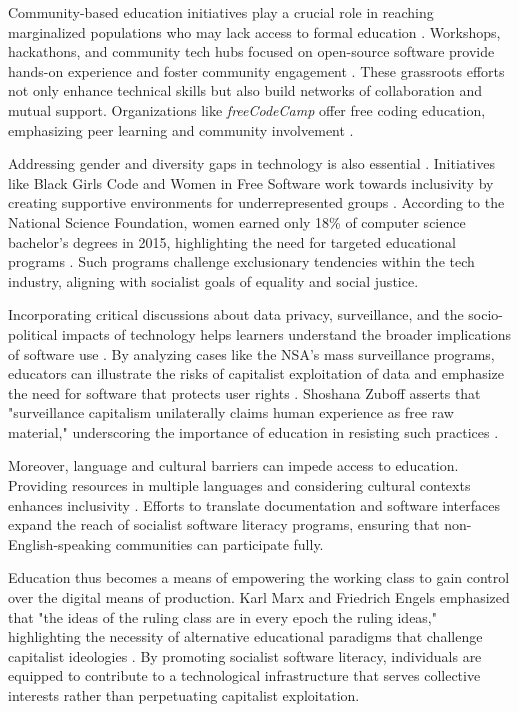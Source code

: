 \begin{refsection}
Community-based education initiatives play a crucial role in reaching marginalized populations who may lack access to formal education \cite[pp.~137-138]{hooks2021}. Workshops, hackathons, and community tech hubs focused on open-source software provide hands-on experience and foster community engagement \cite[pp.~66-68]{Lakhani2005}. These grassroots efforts not only enhance technical skills but also build networks of collaboration and mutual support. Organizations like \textit{freeCodeCamp} offer free coding education, emphasizing peer learning and community involvement \cite{FCC2018}.

Addressing gender and diversity gaps in technology is also essential \cite[pp.~96-98]{Faulkner2007}. Initiatives like Black Girls Code and Women in Free Software work towards inclusivity by creating supportive environments for underrepresented groups \cite[pp.~44-46]{Gurer2002}. According to the National Science Foundation, women earned only 18\% of computer science bachelor's degrees in 2015, highlighting the need for targeted educational programs \cite[pp.~12-14]{NSF2017}. Such programs challenge exclusionary tendencies within the tech industry, aligning with socialist goals of equality and social justice.

Incorporating critical discussions about data privacy, surveillance, and the socio-political impacts of technology helps learners understand the broader implications of software use \cite[pp.~151-152]{Zuboff2020}. By analyzing cases like the NSA's mass surveillance programs, educators can illustrate the risks of capitalist exploitation of data and emphasize the need for software that protects user rights \cite[pp.~58-60]{Greenwald2015}. Shoshana Zuboff asserts that "surveillance capitalism unilaterally claims human experience as free raw material," underscoring the importance of education in resisting such practices \cite[pp.~10]{Zuboff2020}.

Moreover, language and cultural barriers can impede access to education. Providing resources in multiple languages and considering cultural contexts enhances inclusivity \cite[pp.~200-202]{Nussbaum2013}. Efforts to translate documentation and software interfaces expand the reach of socialist software literacy programs, ensuring that non-English-speaking communities can participate fully.

Education thus becomes a means of empowering the working class to gain control over the digital means of production. Karl Marx and Friedrich Engels emphasized that "the ideas of the ruling class are in every epoch the ruling ideas," highlighting the necessity of alternative educational paradigms that challenge capitalist ideologies \cite[pp.~64]{Marx2011}. By promoting socialist software literacy, individuals are equipped to contribute to a technological infrastructure that serves collective interests rather than perpetuating capitalist exploitation.


\end{refsection}
